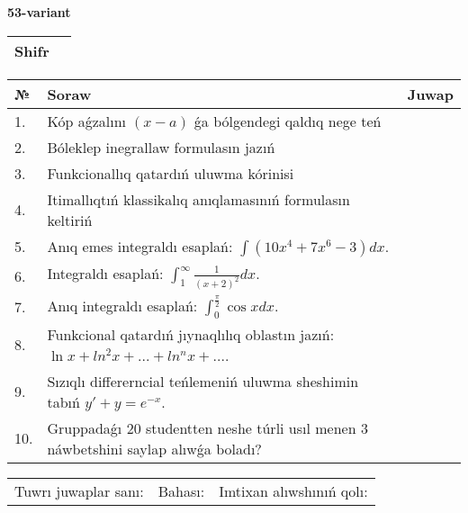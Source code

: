 \documentclass{article}
\begin{document}
  \egroup
  
  \newpage
  
  
  \textbf{53-variant}\\
  
  \bgroup
  \def\arraystretch{1.6} %
  
  \begin{tabular}{|m{5.7cm}|m{9.5cm}|}
  \hline
  Shifr & \\
  \hline
  \end{tabular}
  
  \vspace{1cm}
  
  \begin{tabular}{|m{0.7cm}|m{10cm}|m{4cm}|}
  \hline
  № & Soraw & Juwap \\
  \hline
  1. & Kóp aǵzalını \((x - a)\) ǵa bólgendegi qaldıq nege teń &  \\
  \hline
  2. & Bóleklep inegrallaw formulasın jazıń &  \\
  \hline
  3. & Funkcionallıq qatardıń uluwma kórinisi &  \\
  \hline
  4. & Itimallıqtıń klassikalıq anıqlamasınıń formulasın keltiriń &  \\
  \hline
  5. & Anıq emes integraldı esaplań: \(\int{\left( 10x^{4} + 7x^{6} - 3 \right)dx}\). &  \\
  \hline
  6. & Integraldı esaplań: \(\int_{1}^{\infty}{\frac{1}{(x + 2)^2 }dx}\). &  \\
  \hline
  7. & Anıq integraldı esaplań: \(\int_{0}^{\frac{\pi}{2}}{\cos xdx}\). &  \\
  \hline
  8. & Funkcional qatardıń jıynaqlılıq oblastın jazıń: \(\ln x + ln^2 x + ... + ln^{n}x + ...\). &  \\
  \hline
  9. & Sızıqlı differerncial teńlemeniń uluwma sheshimin tabıń \(y' + y = e^{- x}\). &  \\
  \hline
  10. & Gruppadaǵı 20 studentten neshe túrli usıl menen 3 náwbetshini saylap alıwǵa boladı? &  \\
  \hline
  \end{tabular}
  
  \vspace{1cm}
  
  \begin{tabular}{lll}
  Tuwrı juwaplar sanı: \underline{\hspace{1.5cm}} & 
  Bahası: \underline{\hspace{1.5cm}} & 
  Imtixan alıwshınıń qolı: \underline{\hspace{2cm}} \\
  \end{tabular}
  
\end{document}
